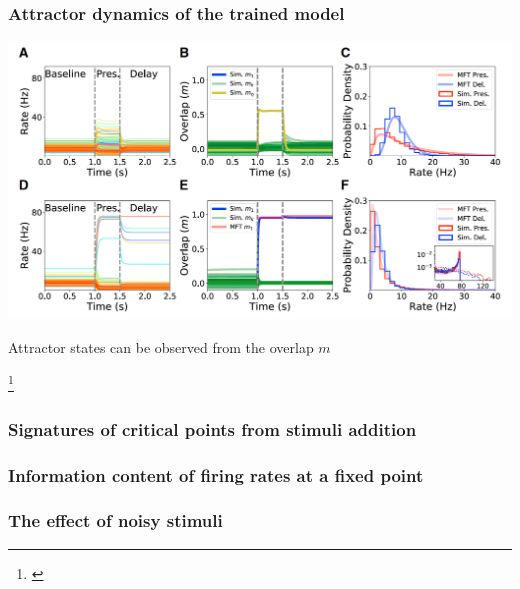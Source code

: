 \documentclass{beamer}
\begin{document}
\begin{frame}[plain]
\frametitle{Attractor dynamics of the trained model}

\vspace{0.2in}

\begin{center}
\includegraphics[scale=0.4]{novel-familiar}
\end{center}

Attractor states can be observed from the overlap $m$

\footnote{\cite{peirera}}

\end{frame}

\begin{frame}[plain]
\frametitle{Signatures of critical points from stimuli addition}



\end{frame}

\begin{frame}[plain]
\frametitle{Information content of firing rates at a fixed point}



\end{frame}

\begin{frame}[plain]
\frametitle{The effect of noisy stimuli}



\end{frame}
\end{document}
